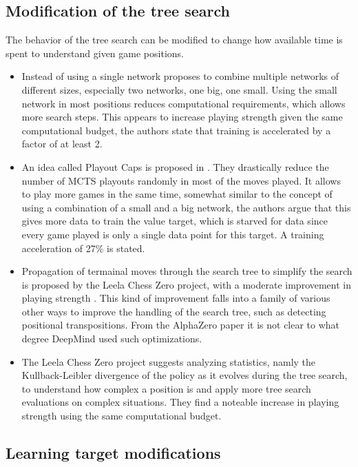 \documentclass[12pt,onecolumn,oneside,titlepage]{article}
\begin{document}
\subsection{Modification of the tree search}

The behavior of the tree search can be modified to change how available time is spent to understand given game positions.

\begin{itemize}
 \item Instead of using a single network \cite{lan2019multiple} proposes to combine multiple networks of different sizes, especially two networks, one big, one small. Using the small network in most positions reduces computational requirements, 
 which allows more search steps. This appears to increase playing strength given the same computational budget, the authors state that training is accelerated by a factor of at least 2.
 \item An idea called Playout Caps is proposed in \cite{wu2019accelerating}. They drastically reduce the number of MCTS playouts randomly in most of the moves played. It allows to play more games in the same time, somewhat similar to 
 the concept of using a combination of a small and a big network, the authors argue that this gives more data to train the value target, which is starved for data since every game played is only a single data point for this target. A training acceleration of 27\% is stated.
 \item Propagation of termainal moves through the search tree to simplify the search is proposed by the Leela Chess Zero project, with a moderate improvement in playing strength \cite{leela0propagation}. This kind of improvement falls
 into a family of various other ways to improve the handling of the search tree, such as detecting positional transpositions. From the AlphaZero paper it is not clear to what degree DeepMind used such optimizations.
 \item The Leela Chess Zero project suggests analyzing statistics, namly the Kullback-Leibler divergence of the policy as it evolves during the tree search, to understand how complex a position is and apply more tree search evaluations on complex situations. They find a noteable increase
   in playing strength \cite{leela0kldgain} using the same computational budget.
\end{itemize}



\subsection{Learning target modifications}
\end{document}
